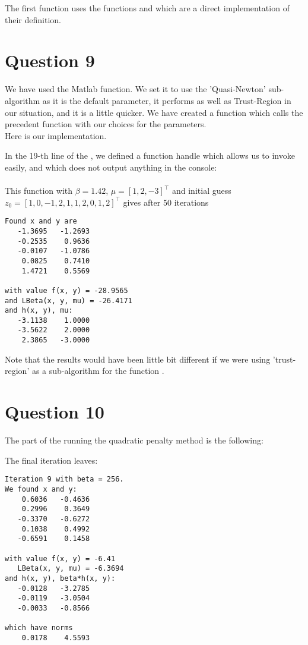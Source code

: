 \documentclass{article}
\newcommand{\tp}{^\top}
\begin{document}




The first function uses the functions  and  which are a direct implementation of their definition.

\section*{Question 9}

We have used the Matlab  function. We set it to use the 'Quasi-Newton' sub-algorithm as it is the default parameter, it performs as well as Trust-Region in our situation, and it is a little quicker.
We have created a function  which calls the precedent function with our choices for the parameters.\\
Here is our implementation.



In the 19-th line of the , we defined a function handle which allows us to invoke  easily, and which does not output anything in the console:\\
\\
This function with $\beta = 1.42$, $\mu = [1, 2, -3]\tp$ and initial guess $z_0 = [1, 0, -1, 2, 1, 1, 2, 0, 1, 2]\tp$  gives after 50 iterations
\begin{lstlisting}
Found x and y are
   -1.3695   -1.2693
   -0.2535    0.9636
   -0.0107   -1.0786
    0.0825    0.7410
    1.4721    0.5569

with value f(x, y) = -28.9565
and LBeta(x, y, mu) = -26.4171
and h(x, y), mu:
   -3.1138    1.0000
   -3.5622    2.0000
    2.3865   -3.0000
\end{lstlisting}

Note that the results would have been little bit different if we were using 'trust-region' as a sub-algorithm for the function .


\section*{Question 10}
The part of the  running the quadratic penalty method is the following:


The final iteration leaves:
\begin{lstlisting}
Iteration 9 with beta = 256.
We found x and y:
    0.6036   -0.4636
    0.2996    0.3649
   -0.3370   -0.6272
    0.1038    0.4992
   -0.6591    0.1458

with value f(x, y) = -6.41
   LBeta(x, y, mu) = -6.3694
and h(x, y), beta*h(x, y):
   -0.0128   -3.2785
   -0.0119   -3.0504
   -0.0033   -0.8566

which have norms
    0.0178    4.5593
\end{lstlisting}
\end{document}
